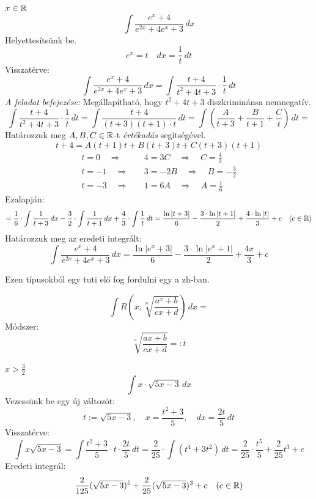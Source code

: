 \documentclass[a4paper,11.5pt]{article}
\begin{document}
	\begin{exercise}$x\in\mathbb{R}$
		\[ \int\frac{e^x+4}{e^{2x}+4e^x+3}\,dx \]
		Helyettesítsünk be.
		\[ e^x=t\quad dx=\frac{1}{t}\,dt \]
		Visszatérve:
		\[ \int\frac{e^x+4}{e^{2x}+4e^x+3}\,dx=\int\frac{t+4}{t^2+4t+3}\cdot\frac{1}{t}\,dt \]
		\textit{A feladat befejezése:} Megállapítható, hogy $t^2+4t+3$ diszkriminánsa nemnegatív.
		\[ \int\frac{t+4}{t^2+4t+3}\cdot\frac{1}{t}\,dt=\int\frac{t+4}{(t+3)(t+1)\cdot t}\,dt=\int\left(\frac{A}{t+3}+\frac{B}{t+1}+\frac{C}{t}\right)\,dt= \]
		Határozzuk meg $A,B,C\in\mathbb{R}$-t \textit{értékadás} segítségével.
		\[ t+4=A(t+1) t+B(t+3) t+C(t+3)(t+1) \]
		\vspace{-7mm}
		\begin{align*}
			t=0\quad \Rightarrow&\quad 4=3C\quad \Rightarrow\quad C=\frac{4}{3}\\
			t=-1\quad \Rightarrow&\quad 3=-2B\quad \Rightarrow\quad B=-\frac{3}{2}\\
			t=-3\quad \Rightarrow&\quad 1=6A\quad \Rightarrow\quad A=\frac{1}{6}
		\end{align*}
		Ezalapján:
		\[ =\frac{1}{6}\cdot\int\frac{1}{t+3}\,dx-\frac{3}{2}\cdot\int\frac{1}{t+1}\,dx+\frac{4}{3}\cdot\int\frac{1}{t}\,dt=\frac{\ln|t+3|}{6}-\frac{3\cdot\ln|t+1|}{2}+\frac{4\cdot\ln|t|}{3}+c\quad (c\in\mathbb{R}) \]
		Határozzuk meg az eredeti integrált:
		\[ \int\frac{e^x+4}{e^{2x}+4e^x+3}\,dx=\frac{\ln|e^x+3|}{6}-\frac{3\cdot\ln|e^x+1|}{2}+\frac{4x}{3}+c \]
	\end{exercise}
	\begin{note}
		Ezen típusokból egy tuti elő fog fordulni egy a zh-ban.
	\end{note}
	\begin{example}
		\[ \int R\left(x;\sqrt[n]{\frac{a^x+b}{cx+d}}\right)\,dx= \]
		Módszer:
		\[ \sqrt[n]{\frac{ax+b}{cx+d}}=:t \]
	\end{example}
	\begin{task}$x>\frac{3}{2}$
		\[ \int x\cdot\sqrt{5{x}-3}\,dx \]
		Vezessünk be egy új változót:
		\[ t:=\sqrt{5x-3},\quad x=\frac{t^2+3}{5},\quad dx=\frac{2t}{5}\,dt \]
		Visszatérve:
		\[ \int x\sqrt{5x-3}=\int\frac{t^2+3}{5}\cdot t\cdot\frac{2t}{5}\,dt=\frac{2}{25}\cdot\int(t^4+3t^2)\,dt=\frac{2}{25}\cdot\frac{t^5}{5}+\frac{2}{25}t^3+c \]
		Eredeti integrál:
		\[ \frac{2}{125}(\sqrt{5x-3})^5+\frac{2}{25}(\sqrt{5x-3})^3+c\quad (c\in\mathbb{R}) \]
	\end{task}
\end{document}
